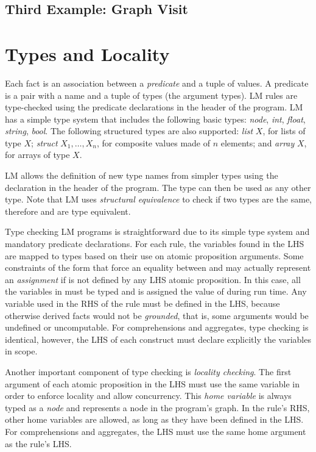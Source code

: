 \subsection{Third Example: Graph Visit}


\section{Types and Locality}

Each fact is an association between a \emph{predicate} and a tuple of values. A
predicate is a pair with a name and a tuple of types (the argument types). LM
rules are type-checked using the predicate declarations in the header of the
program. LM has a simple type system that includes the following basic types:
\emph{node}, \emph{int}, \emph{float}, \emph{string}, \emph{bool}. The following
structured types are also supported: \emph{list} $X$, for lists of type $X$;
\emph{struct} $X_1, \ldots, X_n$, for composite values made of $n$ elements; and
\emph{array} $X$, for arrays of type $X$.

LM allows the definition of new type names from simpler types using the
declaration  in the header of the program. The
type  can then be used as any other type. Note that LM uses
\emph{structural equivalence} to check if two types are the same, therefore
 and  are type equivalent.

Type checking LM programs is straightforward due to its simple type system and
mandatory predicate declarations. For each rule, the variables found in the LHS
are mapped to types based on their use on atomic proposition arguments. Some
constraints of the form  that force an equality between
 and  may actually represent an \emph{assignment} if
 is not defined by any LHS atomic proposition. In this case, all the
variables in  must be typed and  is assigned the value
of  during run time.  Any variable used in the RHS of the rule
must be defined in the LHS, because otherwise derived facts would not be
\emph{grounded}, that is, some arguments would be undefined or uncomputable.
For comprehensions and aggregates, type checking is identical, however, the LHS
of each construct must declare explicitly the variables in scope.

Another important component of type checking is \emph{locality checking}. The
first argument of each atomic proposition in the LHS must use the same variable
in order to enforce locality and allow concurrency. This \emph{home variable} is
always typed as a \emph{node} and represents a node in the program's graph. In
the rule's RHS, other home variables are allowed, as long as they have been
defined in the LHS. For comprehensions and aggregates, the LHS must use the
same home argument as the rule's LHS.

